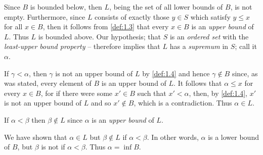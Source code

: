 \documentclass[leqno]{article}
\makeatletter
\theoremstyle{definition}
\theoremstyle{remark}
\let\oldproofname=\proofname
\renewcommand{\proofname}{\bf{\textit{\oldproofname}}}
\renewenvironment{proof}[1][\proofname]{\par
  \pushQED{\qed}%
  \normalfont \topsep6\p@\@plus6\p@\relax
  \list{}{\leftmargin=0mm
          \rightmargin=0mm
          \settowidth{\itemindent}{\itshape#1}%
          \labelwidth=4mm
          \parsep=0pt \listparindent=0mm%
  }
  \item[\hskip\labelsep
        \itshape
    #1\@addpunct{.}]\ignorespaces
}{%
  \popQED\endlist\@endpefalse
}
\makeatother
\begin{document}
            \begin{proof}
                Since $B$ is bounded below, then $L$, being the set of all lower bounds of $B$, is not empty. Furthermore, since $L$ consists of exactly those $y\in S$ which satisfy $y\leq x$ for all $x\in B$, then it follows from \cref{def:1.3} that every $x\in B$ is an \emph{upper bound} of $L$. Thus $L$ is bounded above. Our hypothesis; that $S$ is an \emph{ordered set} with the \emph{least-upper bound property} -- therefore implies that $L$ has a \emph{supremum} in $S$; call it $\alpha$.\par\hspace{4mm} If $\gamma<\alpha$, then $\gamma$ is not an upper bound of $L$ by \cref{def:1.4} and hence $\gamma\notin B$ since, as was stated, every element of $B$ is an upper bound of $L$. It follows that $\alpha\leq x$ for every $x\in B$, for if there were some $x'\in B$ such that $x' < \alpha$, then, by \cref{def:1.4}, $x'$ is not an upper bound of $L$ and so $x'\notin B$, which is a contradiction. Thus $\alpha\in L$.\par\hspace{4mm} If $\alpha <\beta$ then $\beta\notin L$ since $\alpha$ is an \emph{upper bound} of $L$.\par\hspace{4mm} We have shown that $\alpha\in L$ but $\beta\notin L$ if $\alpha <\beta$. In other words, $\alpha$ is a lower bound of $B$, but $\beta$ is not if $\alpha <\beta$. Thus $\alpha=\inf B$.
            \end{proof}
            
\end{document}
